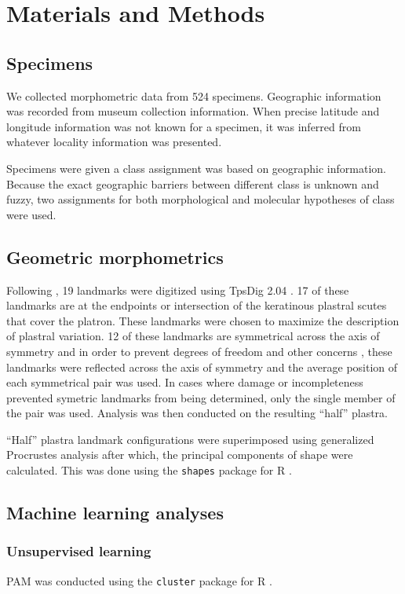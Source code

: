 \documentclass[12pt]{article}\usepackage{graphicx, color}
\begin{document}
\section{Materials and Methods}
\subsection{Specimens}
We collected morphometric data from 524 specimens. Geographic information was recorded from museum collection information. When precise latitude and longitude information was not known for a specimen, it was inferred from whatever locality information was presented. %

Specimens were given a class assignment was based on geographic information. Because the exact geographic barriers between different class is unknown and fuzzy, two assignments for both morphological and molecular hypotheses of class were used. 

\subsection{Geometric morphometrics}
Following \citet{Angielczyk2011}, 19 landmarks were digitized using TpsDig 2.04 \citep{Rohlf2005}. 17 of these landmarks are at the endpoints or intersection of the keratinous plastral scutes that cover the platron. These landmarks were chosen to maximize the description of plastral variation. 12 of these landmarks are symmetrical across the axis of symmetry and in order to prevent degrees of freedom and other concerns \citep{Klingenberg2007}, these landmarks were reflected across the axis of symmetry and the average position of each symmetrical pair was used. In cases where damage or incompleteness prevented symetric landmarks from being determined, only the single member of the pair was used. Analysis was then conducted on the resulting ``half'' plastra.

``Half'' plastra landmark configurations were superimposed using generalized Procrustes analysis \citep{Dryden1998a} after which, the principal components of shape were calculated. This was done using the \texttt{shapes} package for R \citep{2013, Dryden2013}.


\subsection{Machine learning analyses}
\subsubsection{Unsupervised learning}
PAM was conducted using the \texttt{cluster} package for R \citep{Maechler2013}.
\end{document}

